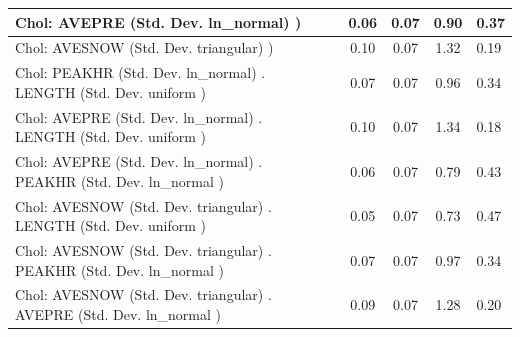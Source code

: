 \begin{table}
\begin{center}
\begin{tabular}{|l|l|c|c|c|l|}
			\hline
			 Chol: AVEPRE (Std. Dev. ln_normal) ) &  & 0.06 & 0.07 & 0.90 & 0.37 \\
			\hline
			 Chol: AVESNOW (Std. Dev. triangular) ) &  & 0.10 & 0.07 & 1.32 & 0.19 \\
			\hline
			 Chol: PEAKHR (Std. Dev. ln_normal) . LENGTH (Std. Dev.   uniform ) &  & 0.07 & 0.07 & 0.96 & 0.34 \\
			\hline
			 Chol: AVEPRE (Std. Dev. ln_normal) . LENGTH (Std. Dev.   uniform ) &  & 0.10 & 0.07 & 1.34 & 0.18 \\
			\hline
			 Chol: AVEPRE (Std. Dev. ln_normal) . PEAKHR (Std. Dev.   ln_normal ) &  & 0.06 & 0.07 & 0.79 & 0.43 \\
			\hline
			 Chol: AVESNOW (Std. Dev. triangular) . LENGTH (Std. Dev.   uniform ) &  & 0.05 & 0.07 & 0.73 & 0.47 \\
			\hline
			 Chol: AVESNOW (Std. Dev. triangular) . PEAKHR (Std. Dev.   ln_normal ) &  & 0.07 & 0.07 & 0.97 & 0.34 \\
			\hline
			 Chol: AVESNOW (Std. Dev. triangular) . AVEPRE (Std. Dev.   ln_normal ) &  & 0.09 & 0.07 & 1.28 & 0.20 \\
			\hline
		\end{tabular}
	\end{center}
\end{table}